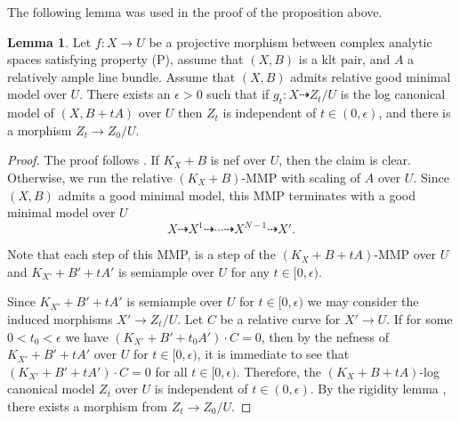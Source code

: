 \documentclass[11pt]{amsart}
\numberwithin{equation}{section}
\theoremstyle{definition}
\theoremstyle{definition}
\newtheorem{lemma}[theorem]{Lemma}
\theoremstyle{definition}
\begin{document}
The following lemma was used in the proof of the proposition above. 
\begin{lemma}\label{l-term}
Let $f:X\to U$ be a projective morphism between complex analytic spaces satisfying property (P), assume that $(X,B)$ is a klt pair, and $A$ a relatively ample line bundle. Assume that $(X,B)$ admits relative good minimal model over $U$. There exists an $\epsilon>0$ such that if $g_t: X \dasharrow Z_t/U$ is the log canonical model of $(X, B+t A)$ over $U$ then $Z_t$ is independent of $t \in(0, \epsilon)$, and there is a morphism $Z_t \to Z_0/U$. 
\end{lemma}

\begin{proof}
The proof follows \cite[Lemma 2.9.2]{HMX18}. If $K_X+B$ is nef over $U$, then the claim is clear. Otherwise, we run the relative $(K_X+B)$-MMP with scaling of $A$ over $U$. Since $(X,B)$ admits a good minimal model, this MMP terminates with a good minimal model over $U$ $$X\dasharrow X^1 \dasharrow \cdots \dasharrow X^{N-1} \dasharrow   X'.$$

Note that each step of this MMP, is a step of the $(K_X+B+tA)$-MMP over $U$ and $K_{X'}+B'+tA'$ is semiample over $U$ for any $t\in [0,\epsilon)$.

Since $K_{X'}+B'+tA'$ is semiample over $U$ for $t\in [0,\epsilon)$ we may consider the induced morphisms $X'\to Z_t/U$. Let $C$ be a relative curve for $X'\to U$.  If for some $0<t_0<\epsilon$ we have $(K_{X'}+B'+t_0A')\cdot C=0$, then by the nefness of $K_{X'}+B'+tA'$ over $U$ for $t\in [0,\epsilon)$, it is immediate to see that $(K_{X'}+B'+tA')\cdot C=0$ for all $t\in[0,\epsilon)$. Therefore, the $(K_X+B+tA)$-log canonical model $Z_t$ over $U$ is independent of $t\in(0,\epsilon)$. By the rigidity lemma \cite[Lemma 4.1.13]{BS95}, there exists a morphism from $Z_t\to Z_0/U$. 
\end{proof}
\end{document}
